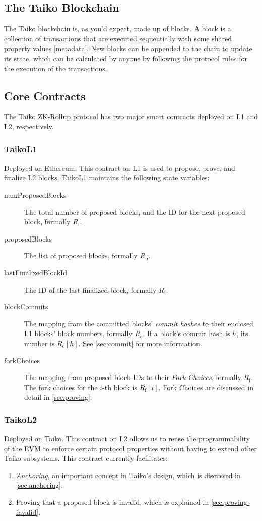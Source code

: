 \documentclass[9pt,oneside]{amsart}
\begin{document}
\begin{multicols}{2}
\section{The Taiko Blockchain}
The Taiko blockchain is, as you'd expect, made up of blocks. A block is a collection of transactions that are executed sequentially with some shared property values \ref{metadata}. New blocks can be appended to the chain to update its state, which can be calculated by anyone by following the protocol rules for the execution of the transactions.

\subsection{Core Contracts}
The Taiko ZK-Rollup protocol has two major smart contracts deployed on L1 and L2, respectively.

\subsubsection{TaikoL1} Deployed on Ethereum. This contract on L1 is used to propose, prove, and finalize L2 blocks. \underline{TaikoL1} maintains the following state variables:

\begin{description}
\item[numProposedBlocks] The total number of proposed blocks, and the ID for the next proposed block, formally $R_\mathrm{i}$.
\item[proposedBlocks] The list of proposed blocks, formally $R_\mathrm{b}$.
\item[lastFinalizedBlockId] The ID of the last finalized block, formally $R_\mathrm{f}$.
\item [blockCommits] The mapping from the committed blocks' \emph{commit hashes} to their enclosed L1 blocks' block numbers, formally $R_\mathrm{c}$. If a block's commit hash is $h$, its number is $R_\mathrm{c}[h]$. See \ref{sec:commit} for more information.
\item[forkChoices] The mapping from proposed block IDs to their \emph{Fork Choices}, formally $R_\mathrm{f}$. The fork choices for the $i$-th block is $R_\mathrm{f}[i]$. Fork Choices are discussed in detail in \ref{sec:proving}.
\end{description}

\subsubsection{{TaikoL2}} Deployed on Taiko. This contract on L2 allows us to reuse the programmability of the EVM to enforce certain protocol properties without having to extend other Taiko subsystems. This contract currently facilitates:
\begin{enumerate}
\item \emph{Anchoring}, an important concept in Taiko's design, which is discussed in \ref{sec:anchoring}.
\item Proving that a proposed block is invalid, which is explained in \ref{sec:proving-invalid}.
\end{enumerate}


\end{multicols}
\end{document}
